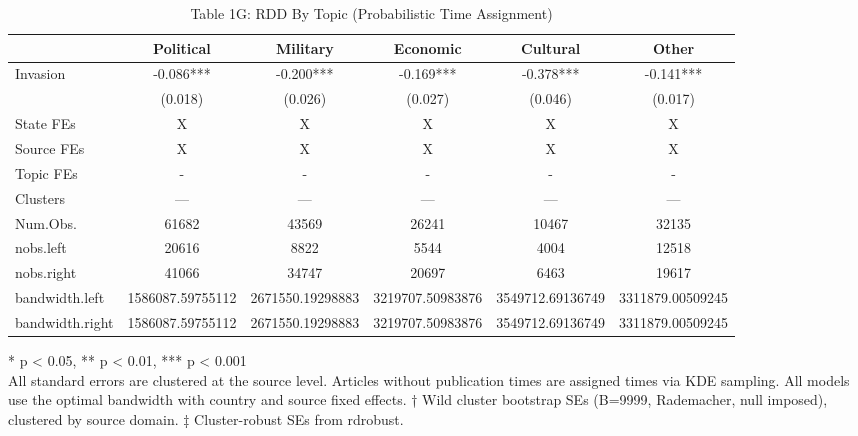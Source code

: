\begin{table}[t]
\caption{\label{tab:table1g}Table 1G: RDD By Topic (Probabilistic Time Assignment)} 
\fontsize{12.0pt}{14.0pt}\selectfont
\begin{tabular*}{\linewidth}{@{\extracolsep{\fill}}lccccc}
\toprule
  & Political & Military & Economic & Cultural & Other \\ 
\midrule\addlinespace[2.5pt]
Invasion & -0.086*** & -0.200*** & -0.169*** & -0.378*** & -0.141*** \\ 
{} & {(0.018)} & {(0.026)} & {(0.027)} & {(0.046)} & {(0.017)} \\ 
State FEs & X & X & X & X & X \\ 
Source FEs & X & X & X & X & X \\ 
Topic FEs & - & - & - & - & - \\ 
Clusters & — & — & — & — & — \\ 
Num.Obs. & 61682 & 43569 & 26241 & 10467 & 32135 \\ 
nobs.left & 20616 & 8822 & 5544 & 4004 & 12518 \\ 
nobs.right & 41066 & 34747 & 20697 & 6463 & 19617 \\ 
bandwidth.left & 1586087.59755112 & 2671550.19298883 & 3219707.50983876 & 3549712.69136749 & 3311879.00509245 \\ 
bandwidth.right & 1586087.59755112 & 2671550.19298883 & 3219707.50983876 & 3549712.69136749 & 3311879.00509245 \\ 
\bottomrule
\end{tabular*}
\begin{minipage}{\linewidth}
\vspace{.05em}
* p < 0.05, ** p < 0.01, *** p < 0.001\\
All standard errors are clustered at the source level. Articles without
publication times are assigned times via KDE sampling. All models use the
optimal bandwidth with country and source fixed effects. † Wild cluster
bootstrap SEs (B=9999, Rademacher, null imposed), clustered by source domain. ‡
Cluster-robust SEs from rdrobust.\\
\end{minipage}
\end{table}

